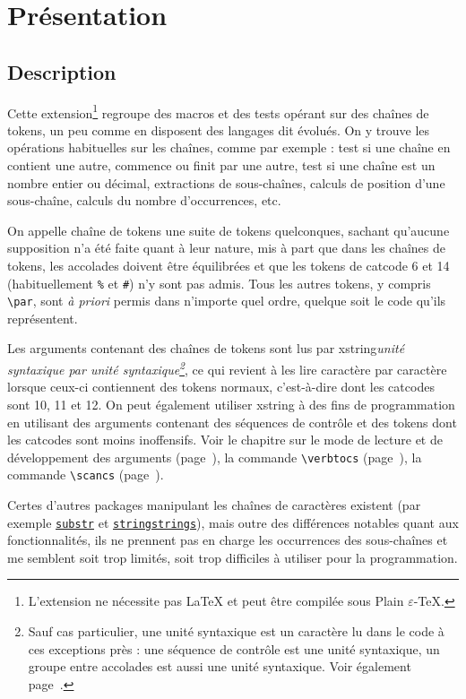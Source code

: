 \documentclass[a4paper,10pt]{article}
\newcommand\guill[1]{\og{}#1\fg{}}
\newcommand\US{unité syntaxique\xspace}
\newcommand\Xstring{\textsf{xstring}\xspace}
\newcommand\verbinline{\lstinline[basicstyle=\normalsize\ttfamily]}
\begin{document}
\tableofcontents

\section{Présentation}
\subsection{Description}
Cette extension\footnote{L'extension ne nécessite pas \LaTeX{} et peut être compilée sous Plain $\varepsilon$-\TeX{}.} regroupe des macros et des tests opérant sur des chaînes de tokens, un peu comme en disposent des langages dit \guill{évolués}. On y trouve les opérations habituelles sur les chaînes, comme par exemple : test si une chaîne en contient une autre, commence ou finit par une autre, test si une chaîne est un nombre entier ou décimal, extractions de sous-chaînes, calculs de position d'une sous-chaîne, calculs du nombre d'occurrences, etc.\medskip

On appelle \guill{chaîne de tokens} une suite de tokens quelconques, sachant qu'aucune supposition n'a été faite quant à leur nature, mis à part que dans les chaînes de tokens, les accolades doivent être équilibrées et que les tokens de catcode 6 et 14 (habituellement \verb|%| et \verb|#|) n'y sont pas admis. Tous les autres tokens, y compris \verbinline|\par|, sont \emph{à priori} permis dans n'importe quel ordre, quelque soit le code qu'ils représentent.\medskip

Les arguments contenant des chaînes de tokens sont lus par \Xstring \emph{\US par \US\footnote{Sauf cas particulier, une \US est un caractère lu dans le code à ces exceptions près : une séquence de contrôle est une \US, un groupe entre accolades est aussi une \US. Voir également page~\pageref{developpementarguments}.}}, ce qui revient à les lire caractère par caractère lorsque ceux-ci contiennent des tokens \guill{normaux}, c'est-à-dire dont les catcodes sont 10, 11 et 12. On peut également utiliser \Xstring à des fins de programmation en utilisant des arguments contenant des séquences de contrôle et des tokens dont les catcodes sont moins inoffensifs. Voir le chapitre sur le mode de lecture et de développement des arguments (page~\pageref{developpementarguments}), la commande \verbinline|\verbtocs| (page~\pageref{verbtocs}), la commande \verbinline|\scancs| (page~\pageref{scancs}).\medskip

Certes d'autres packages manipulant les chaînes de caractères existent (par exemple \href{http://www.ctan.org/tex-archive/macros/latex/contrib/substr/}{\nolinkurl{substr}} et \href{http://www.ctan.org/tex-archive/macros/latex/contrib/stringstrings/}{\nolinkurl{stringstrings}}), mais outre des différences notables quant aux fonctionnalités, ils ne prennent pas en charge les occurrences des sous-chaînes et me semblent soit trop limités, soit trop difficiles à utiliser pour la programmation.\medskip
\end{document}

